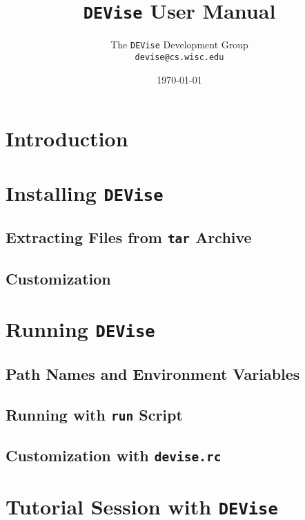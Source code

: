 
\def\Devise{{\tt DEVise} }
\def\filename#1{{\tt #1}}
\def\code#1{{\tt #1}}
\def\menu#1{{\tt #1}}
\def\term#1{#1}
\def\variable#1{{\tt #1}}


\title{\Devise User Manual}
\author{The \Devise Development Group \\
\code{devise@cs.wisc.edu}
}
\date{\today}

\maketitle

\section{Introduction}

\section{Installing \Devise}

\subsection{Extracting Files from \code{tar} Archive}

\subsection{Customization}

\section{Running \Devise}

\subsection{Path Names and Environment Variables}

\subsection{Running with \code{run} Script}

\subsection{Customization with \filename{devise.rc}}

\section{Tutorial Session with \Devise}

